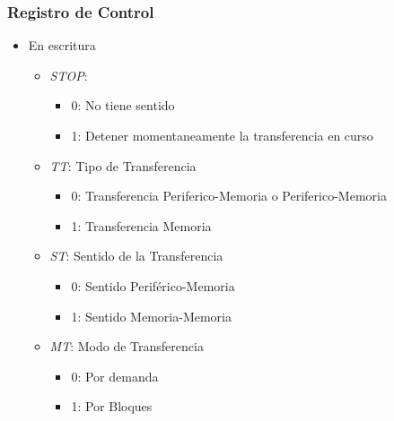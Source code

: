 \documentclass{beamer}
\begin{document}
\begin{frame}
\frametitle{Registro de Control}
  \begin{itemize}
     \item En escritura
     \begin{itemize}
        \item \emph{STOP}:
	  \begin{itemize}
	      \item 0: No tiene sentido
	      \item 1: Detener momentaneamente la transferencia en curso
	  \end{itemize}
        \item \emph{TT}: Tipo de Transferencia
	  \begin{itemize}
	      \item 0: Transferencia Periferico-Memoria o Periferico-Memoria
	      \item 1: Transferencia Memoria
	  \end{itemize}
        \item \emph{ST}: Sentido de la Transferencia
	  \begin{itemize}
	      \item 0: Sentido Periférico-Memoria
	      \item 1: Sentido Memoria-Memoria
	  \end{itemize}
        \item \emph{MT}: Modo de Transferencia
	  \begin{itemize}
	      \item 0: Por demanda
	      \item 1: Por Bloques
	  \end{itemize}

     \end{itemize}
  \end{itemize}
\end{frame}
\end{document}
